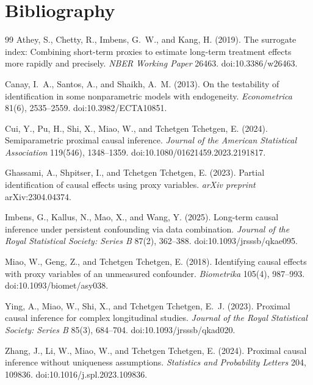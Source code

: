 \documentclass[11pt]{article}
\theoremstyle{definition}
\theoremstyle{plain}
\theoremstyle{remark}
\begin{document}
\section*{Bibliography}
\begin{thebibliography}{99}
Athey, S., Chetty, R., Imbens, G.~W., and Kang, H. (2019).
\newblock The surrogate index: Combining short-term proxies to estimate
long-term treatment effects more rapidly and precisely.
\newblock \emph{NBER Working Paper} 26463. doi:10.3386/w26463.

Canay, I.~A., Santos, A., and Shaikh, A.~M. (2013).
\newblock On the testability of identification in some nonparametric models
with endogeneity.
\newblock \emph{Econometrica} 81(6), 2535--2559. doi:10.3982/ECTA10851.

Cui, Y., Pu, H., Shi, X., Miao, W., and Tchetgen Tchetgen, E. (2024).
\newblock Semiparametric proximal causal inference.
\newblock \emph{Journal of the American Statistical Association} 119(546),
1348--1359. doi:10.1080/01621459.2023.2191817.

Ghassami, A., Shpitser, I., and Tchetgen Tchetgen, E. (2023).
\newblock Partial identification of causal effects using proxy variables.
\newblock \emph{arXiv preprint} arXiv:2304.04374.

Imbens, G., Kallus, N., Mao, X., and Wang, Y. (2025).
\newblock Long-term causal inference under persistent confounding via data
combination.
\newblock \emph{Journal of the Royal Statistical Society: Series B} 87(2),
362--388. doi:10.1093/jrsssb/qkae095.

Miao, W., Geng, Z., and Tchetgen Tchetgen, E. (2018).
\newblock Identifying causal effects with proxy variables of an unmeasured
confounder.
\newblock \emph{Biometrika} 105(4), 987--993. doi:10.1093/biomet/asy038.

Ying, A., Miao, W., Shi, X., and Tchetgen Tchetgen, E.~J. (2023).
\newblock Proximal causal inference for complex longitudinal studies.
\newblock \emph{Journal of the Royal Statistical Society: Series B} 85(3),
684--704. doi:10.1093/jrsssb/qkad020.

Zhang, J., Li, W., Miao, W., and Tchetgen Tchetgen, E. (2024).
\newblock Proximal causal inference without uniqueness assumptions.
\newblock \emph{Statistics and Probability Letters} 204, 109836.
doi:10.1016/j.spl.2023.109836.
\end{thebibliography}
\end{document}
